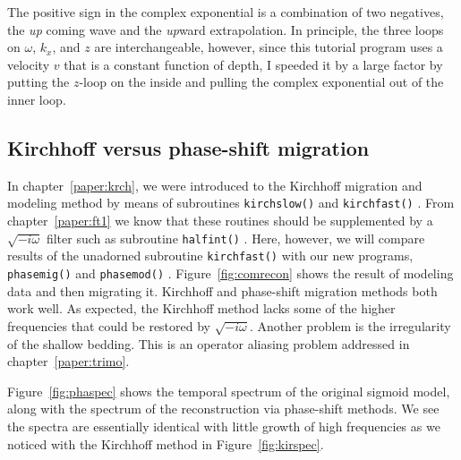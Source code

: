 \par
The positive sign in the complex exponential is a combination of two negatives,
the {\em  up}
coming wave and the {\em  up}ward extrapolation.
In principle,
the three loops on  $\omega$, $k_x$, and  $z$  are interchangeable,
however, since this tutorial program uses
a velocity $v$ that is a constant function of depth,
I speeded it by a large factor by putting the $z$-loop on the inside
and pulling the complex exponential out of the inner loop.

\subsection{Kirchhoff versus phase-shift migration}
In chapter~\ref{paper:krch}, we were introduced to the Kirchhoff
migration and modeling method by means of subroutines
\texttt{kirchslow()}  and \texttt{kirchfast()} .
From chapter~\ref{paper:ft1} we know that these routines should be
supplemented by a $\sqrt{-i\omega}$
filter such as subroutine \texttt{halfint()} .
Here, however,
we will compare results of the unadorned subroutine \texttt{kirchfast()} 
with our new programs, \texttt{phasemig()}  and \texttt{phasemod()} .
Figure~\ref{fig:comrecon} shows the result of modeling data and then migrating it.
Kirchhoff and phase-shift migration methods both work well.
As expected, the Kirchhoff method lacks some of the higher frequencies
that could be restored by $\sqrt{-i\omega}$.
Another problem is the irregularity of the shallow bedding.
This is an operator aliasing problem
addressed in chapter~\ref{paper:trimo}.


Figure~\ref{fig:phaspec} shows the temporal spectrum of the original sigmoid model,
along with the spectrum of the reconstruction via phase-shift methods.
We see the spectra are essentially identical
with little growth of high frequencies
as we noticed with the Kirchhoff method
in Figure~\ref{fig:kirspec}.

